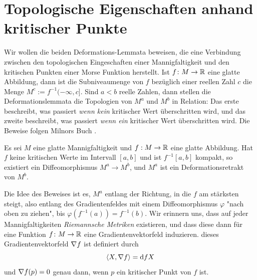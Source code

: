 \section{Topologische Eigenschaften anhand kritischer Punkte}

Wir wollen die beiden Deformations-Lemmata beweisen, die eine Verbindung zwischen den topologischen
Eingeschaften einer Mannigfaltigkeit und den kritischen Punkten einer Morse Funktion herstellt.
Ist $f \colon M \to { \mathbb R }$ eine glatte Abbildung, dann ist die Subniveaumenge von $f$ bezüglich 
einer reellen Zahl $c$ die Menge $M^c := f^{-1}(- \infty, c]$. Sind $a < b$ reelle Zahlen, dann
stellen die Deformationslemmata die Topologien von $M^a$ und $M^b$ in Relation: Das erste beschreibt, 
was passiert \textit{wenn kein} kritischer Wert überschritten wird, und das zweite beschreibt, was 
passiert \textit{wenn ein} kritischer Wert überschritten wird. Die Beweise folgen Milnors Buch 
\cite{morse}.

\begin{theorem}
    \label{satz: erstes deformationslemma}
    Es sei $M$ eine glatte Mannigfaltigkeit und $f: M \rightarrow { \mathbb R }$ eine
    glatte Abbildung. Hat $f$ keine kritischen Werte im Intervall $[a, b]$ und 
    ist $f^{-1}[a, b]$ kompakt, so existiert ein Diffeomorphismus 
    $M^a \rightarrow M^b$, und $M^a$ ist ein Deformationsretrakt von $M^b$.
\end{theorem}

Die Idee des Beweises ist es, $M^a$ entlang der Richtung, in die $f$ am stärksten
steigt, also entlang des Gradientenfeldes mit einem Diffeomorphismus $\varphi$ 
"nach oben zu ziehen", bis $\varphi(f^{-1}(a)) = f^{-1}(b)$.
Wir erinnern uns, dass auf jeder Mannigfaltigkeiten \textit{Riemannsche Metriken} existieren,
und dass diese dann für eine Funktion $f \colon M \to { \mathbb R }$ eine Gradientenvektorfeld induzieren.
dieses Gradientenvektorfeld ${ \nabla } f$ ist definiert durch 
\[ \langle X , { \nabla } f \rangle = { \operatorname{d} } f X \]
und ${ \nabla } f (p) = 0$ genau dann, wenn $p$ ein kritischer Punkt von $f$ ist.

